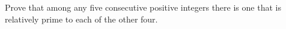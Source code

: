 Prove that among any five consecutive positive integers there is one that is relatively prime to each of the other four.
